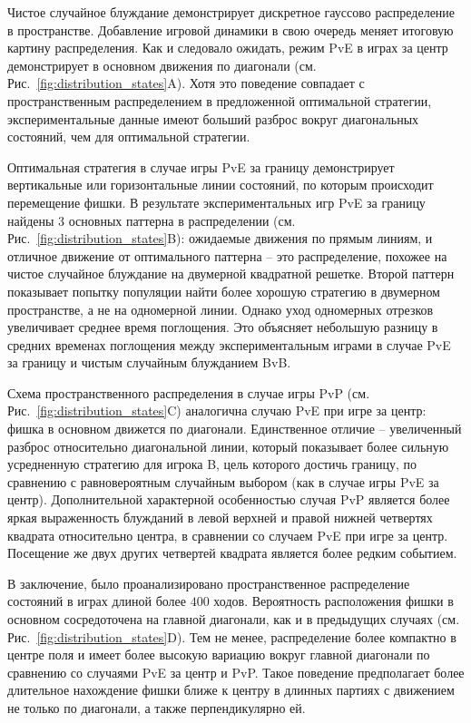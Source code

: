 Чистое случайное блуждание демонстрирует дискретное гауссово распределение в пространстве. 
Добавление игровой динамики в свою очередь меняет итоговую картину распределения. 
Как и следовало ожидать, режим PvE в играх за центр демонстрирует в основном движения по диагонали (см. Рис.~\cref{fig:distribution_states}A). 
Хотя это поведение совпадает с пространственным распределением в предложенной оптимальной стратегии, 
экспериментальные данные имеют больший разброс вокруг диагональных состояний, чем для оптимальной стратегии.

Оптимальная стратегия в случае игры PvE за границу демонстрирует вертикальные или горизонтальные линии состояний, 
по которым происходит перемещение фишки. В результате экспериментальных игр PvE за границу найдены 
3 основных паттерна в распределении (см. Рис.~\cref{fig:distribution_states}B): ожидаемые движения по прямым линиям, и 
отличное движение от оптимального паттерна -- это распределение, похожее на чистое случайное блуждание на двумерной квадратной решетке. 
Второй паттерн показывает попытку популяции найти более хорошую стратегию в двумерном пространстве, а не на одномерной линии. 
Однако уход одномерных отрезков увеличивает среднее время поглощения. Это объясняет небольшую разницу в средних временах 
поглощения между экспериментальным играми в случае PvE за границу и чистым случайным блужданием BvB.

Схема пространственного распределения в случае игры PvP (см. Рис.~\cref{fig:distribution_states}C) аналогична случаю PvE при игре за центр: 
фишка в основном движется по диагонали. Единственное отличие -- увеличенный разброс относительно диагональной линии, 
который показывает более сильную усредненную стратегию для игрока B, цель которого достичь границу, 
по сравнению с равновероятным случайным выбором (как в случае игры PvE за центр).
Дополнительной характерной особенностью случая PvP является более яркая выраженность
блужданий в левой верхней и правой нижней четвертях квадрата относительно центра, в сравнении со случаем PvE при игре за центр.
Посещение же двух других четвертей квадрата является более редким событием.

В заключение, было проанализировано пространственное распределение состояний в играх длиной более $400$ ходов. 
Вероятность расположения фишки в основном сосредоточена на главной диагонали, как и в предыдущих случаях (см. Рис.~\cref{fig:distribution_states}D). 
Тем не менее, распределение более компактно в центре поля и имеет более высокую вариацию вокруг главной диагонали 
по сравнению со случаями PvE за центр и PvP. Такое поведение предполагает более длительное нахождение фишки ближе к центру 
в длинных партиях с движением не только по диагонали, а также перпендикулярно ей.


